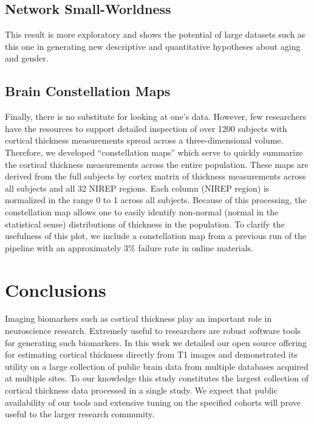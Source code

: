 \subsection{Network Small-Worldness}
This result is more exploratory and shows the potential of large
datasets such as this one in generating new descriptive and
quantitative hypotheses about aging and gender.  

\subsection{Brain Constellation Maps}
Finally, there is no substitute for looking at one's data.  However,
few researchers have the resources to support detailed 
inspection of over 1200 subjects with cortical thickness
measurements spread across a three-dimensional volume.  Therefore, we
developed ``constellation maps'' which serve to quickly summarize the
cortical thickness measurements across the entire population.   These
maps are derived from the full subjects by cortex %
matrix of thickness measurements
across all subjects and all 32 NIREP regions.  Each column (NIREP
region) is normalized in the range 0 to 1 across all subjects.
Because of this processing, the constellation map allows one to
easily identify non-normal (normal in the statistical sense)
distributions of thickness in the population.  
To clarify the
usefulness of this plot, we include a constellation map from a
previous run of the pipeline with an approximately 3\% failure rate in
online materials. 

\section{Conclusions}

Imaging biomarkers such as cortical thickness play an 
important role in neuroscience research.  Extremely useful to
researchers are robust software tools for generating such 
biomarkers.  In this work we detailed our open source offering for estimating
cortical thickness directly from T1 images and demonstrated
its utility on a large collection of public brain data from
multiple databases acquired at multiple sites.  To our knowledge
this study constitutes the largest collection of cortical
thickness data processed in a single study.  
We expect that public availability of our tools and extensive tuning on 
the specified cohorts will prove useful to the larger
research community.  

